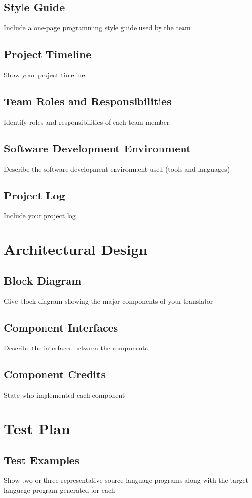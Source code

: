 \documentclass[12pt]{book}
\begin{document}
	\section{\lang Style Guide}
		Include a one-page programming style guide used by the team
	\section{Project Timeline}
		Show your project timeline
	\section{Team Roles and Responsibilities}
		Identify roles and responsibilities of each team member
	\section{Software Development Environment}
		Describe the software development environment used (tools and languages)
	\section{Project Log}
		Include your project log


\chapter{Architectural Design}
	\section{Block Diagram}
		Give block diagram showing the major components of your translator
	\section{Component Interfaces}
		Describe the interfaces between the components
	\section{Component Credits}
		State who implemented each component

\chapter{Test Plan}
	\section{Test Examples}
		Show two or three representative source language programs along with the target language program generated for each
\end{document}
